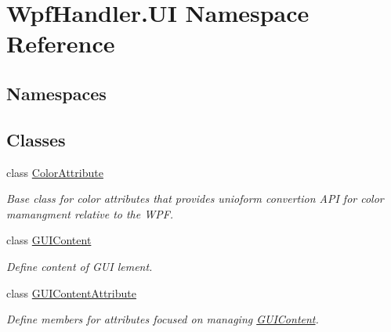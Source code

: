 \hypertarget{namespace_wpf_handler_1_1_u_i}{}\section{Wpf\+Handler.\+UI Namespace Reference}
\label{namespace_wpf_handler_1_1_u_i}
\subsection*{Namespaces}
\begin{DoxyCompactItemize}
\end{DoxyCompactItemize}
\subsection*{Classes}
\begin{DoxyCompactItemize}
\item 
class \mbox{\hyperlink{class_wpf_handler_1_1_u_i_1_1_color_attribute}{Color\+Attribute}}
\begin{DoxyCompactList}\small\item\em Base class for color attributes that provides unioform convertion A\+PI for color mamangment relative to the W\+PF. \end{DoxyCompactList}\item 
class \mbox{\hyperlink{class_wpf_handler_1_1_u_i_1_1_g_u_i_content}{G\+U\+I\+Content}}
\begin{DoxyCompactList}\small\item\em Define content of G\+UI lement. \end{DoxyCompactList}\item 
class \mbox{\hyperlink{class_wpf_handler_1_1_u_i_1_1_g_u_i_content_attribute}{G\+U\+I\+Content\+Attribute}}
\begin{DoxyCompactList}\small\item\em Define members for attributes focused on managing \mbox{\hyperlink{class_wpf_handler_1_1_u_i_1_1_g_u_i_content}{G\+U\+I\+Content}}. \end{DoxyCompactList}\end{DoxyCompactItemize}
